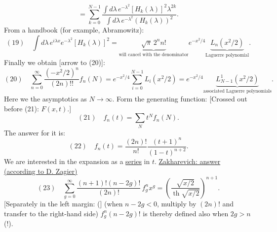 \begin{equation*}
=\sum_{k=0}^{N-1}\frac{\int d\lambda\,e^{-\lambda^2}[H_k(\lambda)]^2\lambda^{2k}}
{\int d\lambda\,e^{-\lambda^2}(H_k(\lambda))^2}.
\end{equation*}
From a handbook (for example, Abramowitz):
\begin{equation*}
(19)\quad \int d\lambda\,e^{i\lambda x}e^{-\lambda^2}[H_k(\lambda)]^2
=\underbrace{\sqrt\pi\,2^n n!}_{\text{will cancel with the denominator}}
e^{-x^2/4}\underbrace{L_n(x^2/2)}_{\text{Laguerre polynomial}}.
\end{equation*}
Finally we obtain [arrow to (20)]:
\begin{equation*}
(20)\quad \sum_{n=0}^{\infty}\frac{(-x^2/2)^n}{(2n)!!}f_n(N)
=e^{-x^2/4}\sum_{i=0}^{N-1}L_i(x^2/2)
=e^{-x^2/4}\underbrace{L^1_{N-1}(x^2/2)}_{\text{associated Laguerre polynomials}}.
\end{equation*}
Here we  the asymptotics as $N\to\infty$. Form the generating function:
[Crossed out before (21): $F(x,t)$.]
\begin{equation*}
(21)\quad f_n(t)=\sum_N t^N f_n(N).
\end{equation*}
The answer for it is:
\begin{equation*}
(22)\quad f_n(t)=\frac{(2n)!}{n!}\frac{(t+1)^n}{(1-t)^{n+2}}.
\end{equation*}
We are interested in the expansion as a \underline{series} in \underline{$t$}.
\underline{Zakharevich: answer (according to D. Zagier)}
\begin{equation*}
(23)\quad \sum_{g=0}^{\infty}\frac{(n+1)!(n-2g)!}{(2n)!}\,f_g^n x^g
=\left(\frac{\sqrt{x/2}}{\operatorname{th}\sqrt{x/2}}\right)^{n+1}.
\end{equation*}
[Separately in the left margin: (]
(when $n-2g<0$, multiply by $(2n)!$ and transfer to the right-hand side)
$f_g^n(n-2g)!$ is thereby defined also when $2g>n$(!).

